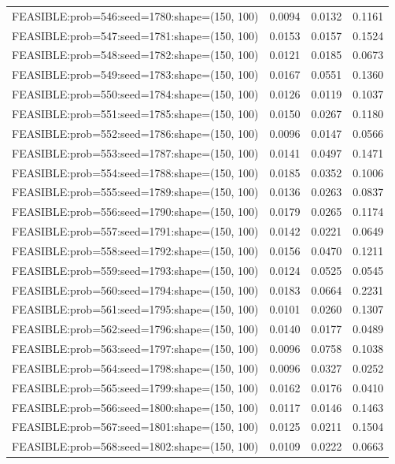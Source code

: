 \begin{longtable}{lccc}
FEASIBLE:prob=546:seed=1780:shape=(150, 100) & 0.0094 & 0.0132 & 0.1161 \\
FEASIBLE:prob=547:seed=1781:shape=(150, 100) & 0.0153 & 0.0157 & 0.1524 \\
FEASIBLE:prob=548:seed=1782:shape=(150, 100) & 0.0121 & 0.0185 & 0.0673 \\
FEASIBLE:prob=549:seed=1783:shape=(150, 100) & 0.0167 & 0.0551 & 0.1360 \\
FEASIBLE:prob=550:seed=1784:shape=(150, 100) & 0.0126 & 0.0119 & 0.1037 \\
FEASIBLE:prob=551:seed=1785:shape=(150, 100) & 0.0150 & 0.0267 & 0.1180 \\
FEASIBLE:prob=552:seed=1786:shape=(150, 100) & 0.0096 & 0.0147 & 0.0566 \\
FEASIBLE:prob=553:seed=1787:shape=(150, 100) & 0.0141 & 0.0497 & 0.1471 \\
FEASIBLE:prob=554:seed=1788:shape=(150, 100) & 0.0185 & 0.0352 & 0.1006 \\
FEASIBLE:prob=555:seed=1789:shape=(150, 100) & 0.0136 & 0.0263 & 0.0837 \\
FEASIBLE:prob=556:seed=1790:shape=(150, 100) & 0.0179 & 0.0265 & 0.1174 \\
FEASIBLE:prob=557:seed=1791:shape=(150, 100) & 0.0142 & 0.0221 & 0.0649 \\
FEASIBLE:prob=558:seed=1792:shape=(150, 100) & 0.0156 & 0.0470 & 0.1211 \\
FEASIBLE:prob=559:seed=1793:shape=(150, 100) & 0.0124 & 0.0525 & 0.0545 \\
FEASIBLE:prob=560:seed=1794:shape=(150, 100) & 0.0183 & 0.0664 & 0.2231 \\
FEASIBLE:prob=561:seed=1795:shape=(150, 100) & 0.0101 & 0.0260 & 0.1307 \\
FEASIBLE:prob=562:seed=1796:shape=(150, 100) & 0.0140 & 0.0177 & 0.0489 \\
FEASIBLE:prob=563:seed=1797:shape=(150, 100) & 0.0096 & 0.0758 & 0.1038 \\
FEASIBLE:prob=564:seed=1798:shape=(150, 100) & 0.0096 & 0.0327 & 0.0252 \\
FEASIBLE:prob=565:seed=1799:shape=(150, 100) & 0.0162 & 0.0176 & 0.0410 \\
FEASIBLE:prob=566:seed=1800:shape=(150, 100) & 0.0117 & 0.0146 & 0.1463 \\
FEASIBLE:prob=567:seed=1801:shape=(150, 100) & 0.0125 & 0.0211 & 0.1504 \\
FEASIBLE:prob=568:seed=1802:shape=(150, 100) & 0.0109 & 0.0222 & 0.0663 \\

\end{longtable}
